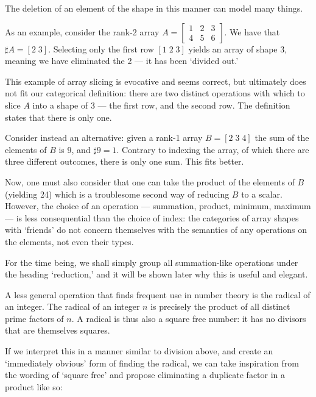 \documentclass{DIKU-report-variant}
\begin{document}
The deletion of an element of the shape in this manner can model many things.

As an example,
consider the rank-2 array \(A = \left[\begin{smallmatrix} 1 & 2 & 3 \\ 4 & 5 & 6 \end{smallmatrix}\right]\).
We have that \(\sharp A = [2\; 3]\). Selecting only the first row \([1\;2\;3]\) yields an array of shape 3,
meaning we have eliminated the 2 --- it has been `divided out.'

This example of array slicing is evocative and seems correct, but ultimately does not fit our categorical
definition: there are two distinct operations with which to slice \(A\) into a shape of 3 --- the first row,
and the second row. The definition states that there is only one.

Consider instead an alternative: given a rank-1 array \(B = [2\;3\;4]\) the sum of the
elements of \(B\) is 9, and \(\sharp 9 = 1\). Contrary to indexing the array, of which there are
three different outcomes, there is only one sum. This fits better.

Now, one must also consider that one can take the product of the elements of \(B\) (yielding 24) which
is a troublesome second way of reducing \(B\) to a scalar. However, the choice of an operation --- summation,
product, minimum, maximum --- is less consequential than the choice of index: the categories of
array shapes with `friends' do not concern themselves with the semantics of any operations on the elements,
not even their types.

For the time being, we shall simply group all summation-like operations under the heading `reduction,' and
it will be shown later why this is useful and elegant.

A less general operation that finds frequent use in number theory is the radical of an integer. The
radical of an integer \(n\) is precisely the product of all distinct prime factors of \(n\). A radical
is thus also a square free number: it has no divisors that are themselves squares.

If we interpret this in a manner similar to division above, and create an `immediately obvious' form
of finding the radical, we can take inspiration from the wording of `square free' and propose eliminating
a duplicate factor in a product like so:
\end{document}
